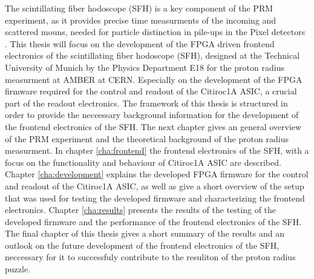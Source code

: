 \newline
The scintillating fiber hodoscope (SFH) is a key component of the PRM experiment, as it provides precise time measurments of the incoming and scattered mouns,
needed for particle distinction in pile-ups in the Pixel detectors .\Autocite{InternalcommunicationIgor}%
\newline
This thesis will focus on the development of the FPGA driven frontend electronics of the scintillating fiber hodoscope (SFH),
designed at the Technical University of Munich by the Physics Department E18 for the proton radius measurment at AMBER at CERN.
Especially on the development of the FPGA firmware required for the control and readout of the Citiroc1A ASIC,
a crucial part of the readout electronics.
\newline 
The framework of this thesis is structured in order to provide the neccessary background information for the development of the frontend electronics of the SFH.
\newline
The next chapter gives an general overview of the PRM experiment and the theoretical background of the proton radius measurment.
\newline 
In chapter \ref{cha:frontend} the frontend electronics of the SFH, with a focus on the functionality and behaviour of Citiroc1A ASIC are described.
\newline
Chapter \ref{cha:development} explains the developed FPGA firmware for the control and readout of the Citiroc1A ASIC, as well as give a short overview of the setup that was used for testing the developed firmware and characterizing the frontend electronics.
\newline
Chapter \ref{cha:results} presents the results of the testing of the developed firmware and the performance of the frontend electronics of the SFH.
\newline 
The final chapter of this thesis gives a short summary of the results and an outlook on the future development of the frontend electronics of the SFH,
neccessary for it to successfuly contribute to the resuliton of the proton radius puzzle.



 

